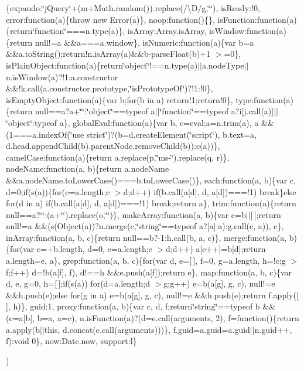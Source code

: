 {\begin{DoxyParamCaption}
\item[{}]{\{expando\+:\char`\"{}j\+Query\char`\"{}+(m+\+Math.\+random()).\+replace(/\textbackslash{}\+D/g,\char`\"{}\char`\"{}), is\+Ready\+:!0, error\+:function(a)\{throw new Error(a)\}, noop\+:function()\{\}, is\+Function\+:function(a)\{return\char`\"{}function\char`\"{}===n.\+type(a)\}, is\+Array\+:\+Array.\+is\+Array, is\+Window\+:function(a)\{return null!=a \&\&a===a.\+window\}, is\+Numeric\+:function(a)\{var b=a \&\&a.\+to\+String();return!n.\+is\+Array(a)\&\&b-\/parse\+Float(b)+1 $>$=0\}, is\+Plain\+Object\+:function(a)\{return\char`\"{}object\char`\"{}!==n.\+type(a)$\vert$$\vert$a.\+node\+Type$\vert$$\vert$n.\+is\+Window(a)?!1\+:a.\+constructor \&\&!k.\+call(a.\+constructor.\+prototype,\char`\"{}is\+Prototype\+Of\char`\"{})?!1\+:!0\}, is\+Empty\+Object\+:function(a)\{var b;for(b in a) return!1;return!0\}, type\+:function(a)\{return null==a?a+\char`\"{}\char`\"{}\+:\char`\"{}object\char`\"{}==typeof a$\vert$$\vert$\char`\"{}function\char`\"{}==typeof a?i\mbox{[}j.\+call(a)\mbox{]}$\vert$$\vert$\char`\"{}object\char`\"{}\+:typeof a\}, global\+Eval\+:function(a)\{var b, c=eval;a=n.\+trim(a), a \&\&(1===a.\+index\+Of(\char`\"{}use strict\char`\"{})?(b=d.\+create\+Element(\char`\"{}script\char`\"{}), b.\+text=a, d.\+head.\+append\+Child(b).\+parent\+Node.\+remove\+Child(b))\+:c(a))\}, camel\+Case\+:function(a)\{return a.\+replace(p,\char`\"{}ms-\/\char`\"{}).\+replace(q, r)\}, node\+Name\+:function(a, b)\{return a.\+node\+Name \&\&a.\+node\+Name.\+to\+Lower\+Case()===b.\+to\+Lower\+Case()\}, each\+:function(a, b)\{var c, d=0;if(s(a))\{for(c=a.\+length;c $>$d;d++) if(b.\+call(a\mbox{[}d\mbox{]}, d, a\mbox{[}d\mbox{]})===!1) break\}else for(d in a) if(b.\+call(a\mbox{[}d\mbox{]}, d, a\mbox{[}d\mbox{]})===!1) break;return a\}, trim\+:function(a)\{return null==a?\char`\"{}\char`\"{}\+:(a+\char`\"{}\char`\"{}).\+replace(o,\char`\"{}\char`\"{})\}, make\+Array\+:function(a, b)\{var c=b$\vert$$\vert$\mbox{[}$\,$\mbox{]};return null!=a \&\&(s(\+Object(a))?n.\+merge(c,\char`\"{}string\char`\"{}==typeof a?\mbox{[}a\mbox{]}\+:a)\+:g.\+call(c, a)), c\}, in\+Array\+:function(a, b, c)\{return null==b?-\/1\+:h.\+call(b, a, c)\}, merge\+:function(a, b)\{for(var c=+b.\+length, d=0, e=a.\+length;c $>$d;d++) a\mbox{[}e++\mbox{]}=b\mbox{[}d\mbox{]};return a.\+length=e, a\}, grep\+:function(a, b, c)\{for(var d, e=\mbox{[}$\,$\mbox{]}, f=0, g=a.\+length, h=!c;g $>$f;f++) d=!b(a\mbox{[}f\mbox{]}, f), d!==h \&\&e.\+push(a\mbox{[}f\mbox{]});return e\}, map\+:function(a, b, c)\{var d, e, g=0, h=\mbox{[}$\,$\mbox{]};if(s(a)) for(d=a.\+length;d $>$g;g++) e=b(a\mbox{[}g\mbox{]}, g, c), null!=e \&\&h.\+push(e);else for(g in a) e=b(a\mbox{[}g\mbox{]}, g, c), null!=e \&\&h.\+push(e);return f.\+apply(\mbox{[}$\,$\mbox{]}, h)\}, guid\+:1, proxy\+:function(a, b)\{var c, d, f;return\char`\"{}string\char`\"{}==typeof b \&\&(c=a\mbox{[}b\mbox{]}, b=a, a=c), n.\+is\+Function(a)?(d=e.\+call(arguments, 2), f=function()\{return a.\+apply(b$\vert$$\vert$this, d.\+concat(e.\+call(arguments)))\}, f.\+guid=a.\+guid=a.\+guid$\vert$$\vert$n.\+guid++, f)\+:void 0\}, now\+:\+Date.\+now, support\+:l\}}
\end{DoxyParamCaption}
)}\hypertarget{jquery-2_82_80_8min_8js_a798d2452a6cada224fa212d35d4e0325}{}\label{jquery-2_82_80_8min_8js_a798d2452a6cada224fa212d35d4e0325}

